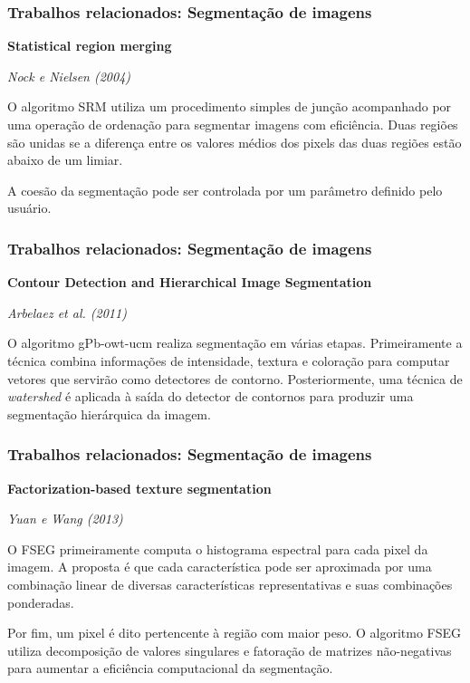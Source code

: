 \documentclass[t]{beamer}
\begin{document}
\begin{frame}
	\frametitle{Trabalhos relacionados: Segmentação de imagens}

	\textbf{Statistical region merging}

	\textit{Nock e Nielsen (2004)}
	
	\vspace{0.5cm}

	O algoritmo SRM utiliza um procedimento simples de junção acompanhado por uma operação de ordenação para segmentar imagens com eficiência. Duas regiões são unidas se a diferença entre os valores médios dos pixels das duas regiões estão abaixo de um limiar. 
	
	\vspace{0.5cm}
	
	A coesão da segmentação pode ser controlada por um parâmetro definido pelo usuário.

\end{frame}

\begin{frame}
	\frametitle{Trabalhos relacionados: Segmentação de imagens}

	\textbf{Contour Detection and Hierarchical Image Segmentation}

	\textit{Arbelaez et al. (2011)}
	
	\vspace{0.5cm}

	O algoritmo gPb-owt-ucm realiza segmentação em várias etapas. Primeiramente a técnica combina informações de intensidade, textura e coloração para computar vetores que servirão como detectores de contorno. Posteriormente, uma técnica de \textit{watershed} é aplicada à saída do detector de contornos para produzir uma segmentação hierárquica da imagem.

\end{frame}

\begin{frame}
	\frametitle{Trabalhos relacionados: Segmentação de imagens}
	
	\textbf{Factorization-based texture segmentation}
	
	\textit{Yuan e Wang (2013)}
	
	\vspace{0.5cm}
	
	O FSEG primeiramente computa o histograma espectral para cada pixel da imagem. A proposta é que cada característica pode ser aproximada por uma combinação linear de diversas características representativas e suas combinações ponderadas. 
	
	\vspace{0.5cm}
	
	Por fim, um pixel é dito pertencente à região com maior peso. O algoritmo FSEG utiliza decomposição de valores singulares e fatoração de matrizes não-negativas para aumentar a eficiência computacional da segmentação.

\end{frame}
\end{document}

